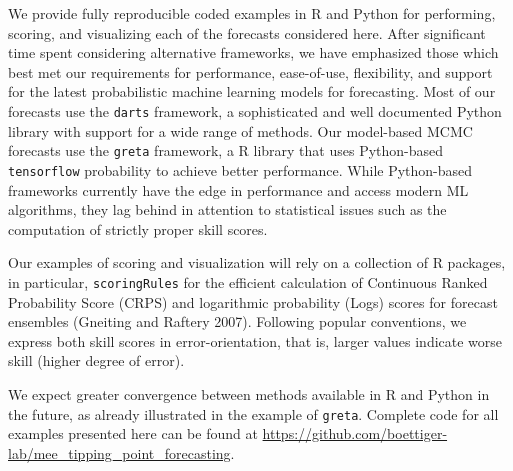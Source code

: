 \documentclass{article}
\begin{document}
We provide fully reproducible coded examples in R and Python for
performing, scoring, and visualizing each of the forecasts considered
here. After significant time spent considering alternative frameworks,
we have emphasized those which best met our requirements for
performance, ease-of-use, flexibility, and support for the latest
probabilistic machine learning models for forecasting. Most of our
forecasts use the \texttt{darts} framework, a sophisticated and well
documented Python library with support for a wide range of methods. Our
model-based MCMC forecasts use the \texttt{greta} framework, a R library
that uses Python-based \texttt{tensorflow} probability to achieve better
performance. While Python-based frameworks currently have the edge in
performance and access modern ML algorithms, they lag behind in
attention to statistical issues such as the computation of strictly
proper skill scores.

Our examples of scoring and visualization will rely on a collection of R
packages, in particular, \texttt{scoringRules} for the efficient
calculation of Continuous Ranked Probability Score (CRPS) and
logarithmic probability (Logs) scores for forecast ensembles (Gneiting
and Raftery 2007). Following popular conventions, we express both skill
scores in error-orientation, that is, larger values indicate worse skill
(higher degree of error).

We expect greater convergence between methods available in R and Python
in the future, as already illustrated in the example of \texttt{greta}.
Complete code for all examples presented here can be found at
\url{https://github.com/boettiger-lab/mee_tipping_point_forecasting}.
\end{document}
